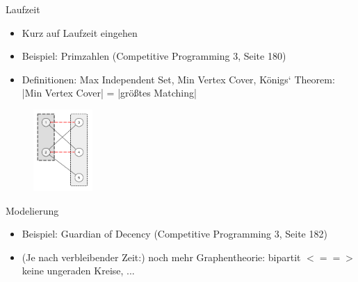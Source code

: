 \documentclass[18pt]{beamer}
\begin{document}
\begin{frame}{Laufzeit}
\begin{itemize}
\item Kurz auf Laufzeit eingehen
\item Beispiel: Primzahlen (Competitive Programming 3, Seite 180)
\item Definitionen: Max Independent Set, Min Vertex Cover, K\"onigs‘ Theorem: |Min Vertex Cover| = |größtes Matching|
\end{itemize}
\begin{figure}
\includegraphics[width = 0.2\textwidth] {img/TobiasT_Laufzeit.jpg}
\end{figure}
\end{frame}

\begin{frame}{Modelierung}
\begin{itemize}
\item Beispiel: Guardian of Decency (Competitive Programming 3, Seite 182)
\item (Je nach verbleibender Zeit:) noch mehr Graphentheorie: bipartit $< == >$ keine ungeraden Kreise, ...
\end{itemize}
\end{frame}
\end{document}
